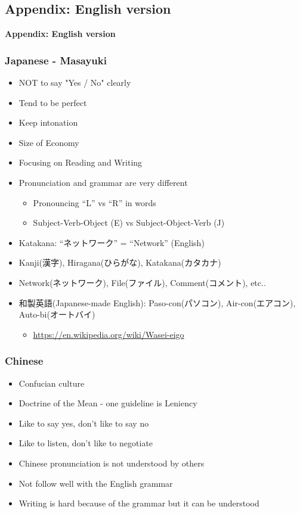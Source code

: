 \documentclass[aspectratio=169,11pt,hyperref={colorlinks=true}]{beamer}
\begin{document}
\subsection{Appendix: English version}
\begin{frame}
  \bf\Huge{Appendix: English version}
\end{frame}


\begin{frame}
\frametitle{Japanese - Masayuki}
  \begin{itemize}
    \item NOT to say "Yes / No" clearly
    \item Tend to be perfect
    \item Keep intonation
    \item Size of Economy
    \item Focusing on Reading and Writing
    \item Pronunciation and grammar are very different
      \begin{itemize}
      \item Pronouncing “L” vs “R” in words
      \item Subject-Verb-Object (E) vs Subject-Object-Verb (J)
      \end{itemize}
    \item Katakana: “ネットワーク” = “Network” (English)
    \item Kanji(漢字), Hiragana(ひらがな), Katakana(カタカナ)
    \item Network(ネットワーク), File(ファイル), Comment(コメント), etc..
    \item 和製英語(Japanese-made English): Paso-con(パソコン), Air-con(エアコン), Auto-bi(オートバイ)
      \begin{itemize}
        \item \url{https://en.wikipedia.org/wiki/Wasei-eigo}
      \end{itemize}
  \end{itemize}
\end{frame}

\begin{frame}
\frametitle{Chinese}
  \begin{itemize}
  \item Confucian culture
  \item Doctrine of the Mean -  one guideline is Leniency
  \item Like to say yes, don't like to say no
  \item Like to listen, don't like to negotiate
  \item Chinese pronunciation is not understood by others
  \item Not follow well with the English grammar
  \item Writing is hard because of the grammar but it can be understood
  \end{itemize}
\end{frame}
\end{document}
